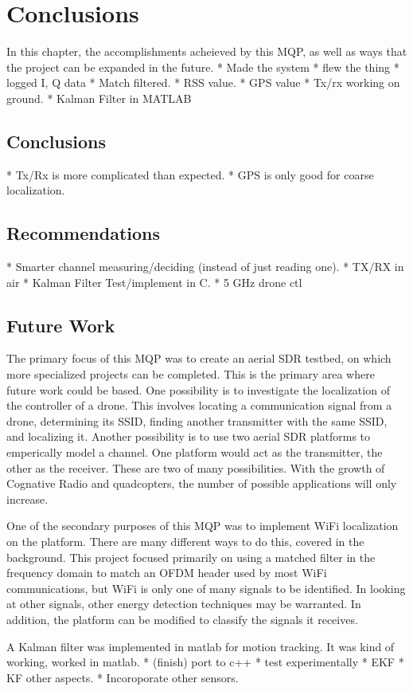 \chapter{Conclusions}
In this chapter, the accomplishments acheieved by this MQP, as well as ways that 
the project can be expanded in the future. 
 * Made the system
 * flew the thing
 * logged I, Q data
 * Match filtered.
 * RSS value.
 * GPS value
 * Tx/rx working on ground.
 * Kalman Filter in MATLAB

\section{Conclusions} %
 * Tx/Rx is more complicated than expected.
 * GPS is only good for coarse localization.

\section{Recommendations}
 * Smarter channel measuring/deciding (instead of just reading one).
 * TX/RX in air
 * Kalman Filter Test/implement in C.
 * 5 GHz drone ctl


\section{Future Work}
The primary focus of this MQP was to create an aerial SDR testbed, on which more 
specialized projects can be completed. This is the primary area where future work
could be based. One possibility is to investigate the localization of the controller
of a drone. This involves locating a communication signal from a drone, determining its
SSID, finding another transmitter with the same SSID, and localizing it. Another possibility
is to use two aerial SDR platforms to emperically model a channel. One platform
would act as the transmitter, the other as the receiver. These are two of many possibilities.
With the growth of Cognative Radio and quadcopters, the number of possible applications
will only increase.\par

One of the secondary purposes of this MQP was to implement WiFi localization on 
the platform. There are many different ways to do this, covered in the background.
This project focused primarily on using a matched filter in the frequency domain to match
an OFDM header used by most WiFi communications, but WiFi is only one of many 
signals to be identified. In looking at other signals, other energy detection
techniques may be warranted. In addition, the platform can be modified to 
classify the signals it receives.\par

A Kalman filter was implemented in matlab for motion tracking. It was kind of 
working, worked in matlab. 
 * (finish) port to c++
 * test experimentally
 * EKF
 * KF other aspects.
 * Incoroporate other sensors.